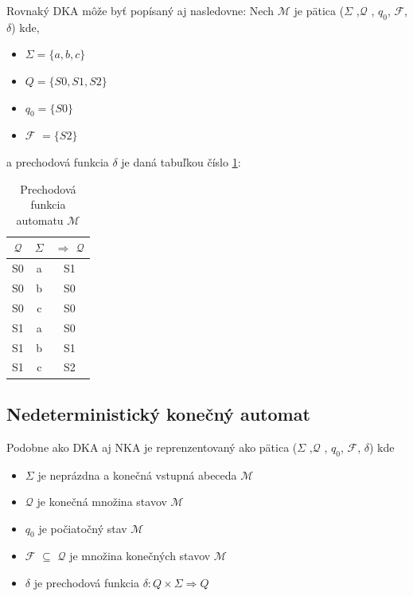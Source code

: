 Rovnaký DKA môže byť popísaný aj nasledovne:
Nech $\mathcal{M}$ je pätica ($\Sigma$ ,$\mathcal{Q}$ , $q_0$, $\mathcal{F}$, $\delta$) kde, 

\begin{itemize}
    \item \begin{math} \Sigma = \{a, b ,c \}  \end{math}
    \item \begin{math} Q = \{S0, S1, S2 \}  \end{math}
    \item \begin{math} q_0 = \{S0 \}  \end{math}
    \item $\mathcal{F}$ \begin{math} = \{S2\}  \end{math}
\end{itemize}
a prechodová funkcia $\delta$ je daná tabuľkou číslo \ref{table:dfaPrechodovaFunckcia}:

\begin{table}[!htbp]    
    \begin{center}
    \begin{tabular}{c c|c}
    $\mathcal{Q}$ & $\Sigma$ & $\Rightarrow$ $\mathcal{Q}$  \\ \hline
    S0 & a & S1 \\ 
    S0 & b & S0 \\ 
    S0 & c & S0 \\ 
    S1 & a & S0 \\
    S1 & b & S1 \\  
    S1 & c & S2 \\  
    \end{tabular}
    \caption{Prechodová funkcia automatu $\mathcal{M}$}
    \label{table:dfaPrechodovaFunckcia}
    \end{center}
    \end{table}


\subsection{Nedeterministický konečný automat}
\noindent Podobne ako DKA aj NKA je reprenzentovaný ako  pätica ($\Sigma$ ,$\mathcal{Q}$ , $q_0$, $\mathcal{F}$, $\delta$) kde
\begin{itemize}
    \item $\Sigma$ je neprázdna a konečná vstupná abeceda $\mathcal{M}$
    \item $\mathcal{Q}$ je konečná množina stavov $\mathcal{M}$
    \item $q_0$ je počiatočný stav $\mathcal{M}$
    \item $\mathcal{F}$ $\subseteq$ $\mathcal{Q}$ je množina konečných stavov $\mathcal{M}$
    \item $\delta$ je prechodová funkcia  \begin{math}\delta : Q \times \Sigma \Rightarrow Q\end{math}
\end{itemize}

